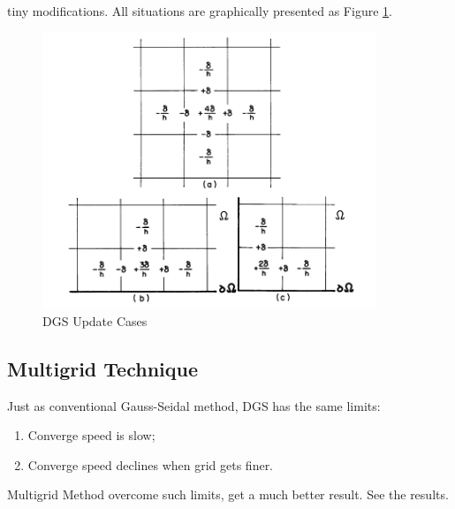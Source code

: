 \begin{enumerate}
        tiny modifications. All situations are graphically presented as Figure \ref{fig:DGS}.
        \begin{figure}[ht]
            \centering
            \includegraphics[width=10cm]{pic/DGS.png}
            \caption{DGS Update Cases}
            \label{fig:DGS}
        \end{figure}  
\end{enumerate}

\newpage
\subsection{Multigrid Technique}
Just as conventional Gauss-Seidal method, DGS has the same limits:
\begin{enumerate}
    \item Converge speed is slow;
    \item Converge speed declines when grid gets finer.
\end{enumerate}
Multigrid Method overcome such limits, get a much better result. See the results.